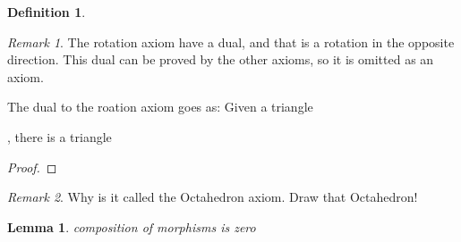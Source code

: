 \documentclass[12pt]{article}
\newtheorem{lemma}[theorem]{Lemma}
\theoremstyle{definition}
\newtheorem{definition}{Definition}[section]
\theoremstyle{remark}
\newtheorem*{remark}{Remark}
\begin{document}
\begin{definition}
\begin{enumerate}
                    \begin{center}
                    \end{center}
            \end{enumerate}
        \end{definition}



        \begin{remark}
            The rotation axiom have a dual, and that is a rotation in the opposite direction. This dual can be proved by the other axioms, so it is omitted as an axiom. 
            
            The dual to the roation axiom goes as:
            Given a triangle , there is a triangle 
        \end{remark}

        \begin{proof}
            
        \end{proof}



        \begin{remark}
            Why is it called the Octahedron axiom. Draw that Octahedron!
        \end{remark}

        \begin{lemma}
            composition of morphisms is zero
        \end{lemma}
\end{document}
